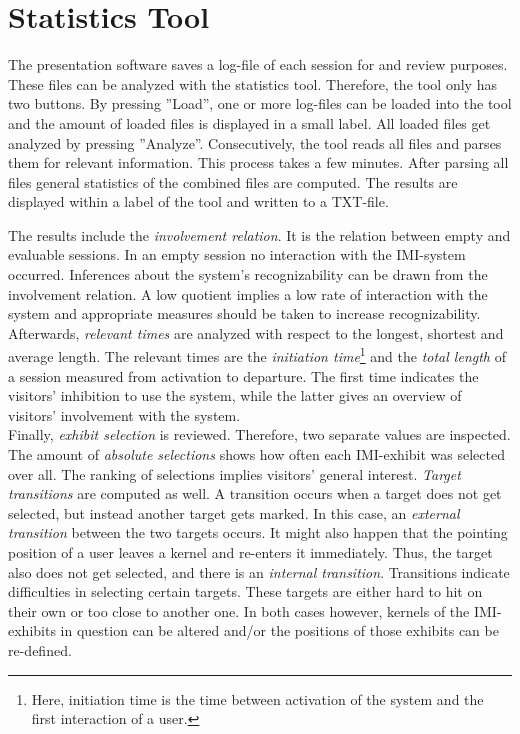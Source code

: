 
\section{Statistics Tool}
\label{implementation_tool}
 
The presentation software saves a log-file of each session for and review purposes. These files can be analyzed with the statistics tool. Therefore, the tool only has two buttons. By pressing ''Load'', one or more log-files can be loaded into the tool and the amount of loaded files is displayed in a small label. All loaded files get analyzed by pressing ''Analyze''. Consecutively, the tool reads all files and parses them for relevant information. This process takes a few minutes. After parsing all files general statistics of the combined files are computed. The results are displayed within a label of the tool and written to a TXT-file.

The results include the \textit{involvement relation}. It is the relation between empty and evaluable sessions. In an empty session no interaction with the \ac{IMI}-system occurred. Inferences about the system's recognizability can be drawn from the involvement relation. A low quotient implies a low rate of interaction with the system and appropriate measures should be taken to increase recognizability.
\\
Afterwards, \textit{relevant times} are analyzed with respect to the longest, shortest and average length. The relevant times are the \textit{initiation time}\footnote{Here, initiation time is the time between activation of the system and the first interaction of a user.} and the \textit{total length} of a session measured from activation to departure. The first time indicates the visitors' inhibition to use the system, while the latter gives an overview of visitors' involvement with the system.
\\
Finally, \textit{exhibit selection} is reviewed. Therefore, two separate values are inspected. The amount of \textit{absolute selections} shows how often each \ac{IMI}-exhibit was selected over all. The ranking of selections implies visitors' general interest. \textit{Target transitions} are computed as well. A transition occurs when a target does not get selected, but instead another target gets marked. In this case, an \textit{external transition} between the two targets occurs. It might also happen that the pointing position of a user leaves a kernel and re-enters it immediately. Thus, the target also does not get selected, and there is an \textit{internal transition}. Transitions indicate difficulties in selecting certain targets. These targets are either hard to hit on their own or too close to another one. In both cases however, kernels of the \ac{IMI}-exhibits in question can be altered and/or the positions of those exhibits can be re-defined.

